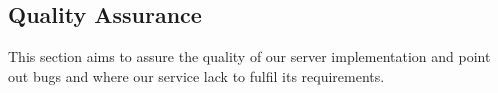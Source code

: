 \subsection{Quality Assurance}
This section aims to assure the quality of our server implementation and point out bugs and where our service lack to fulfil its requirements.



\newpage